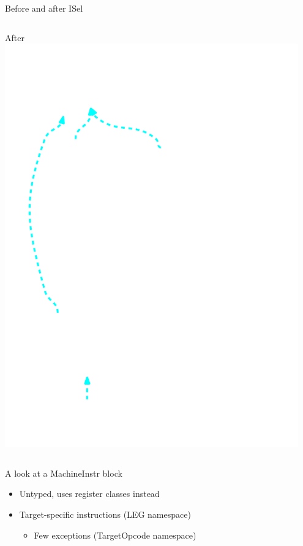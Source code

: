 \begin{frame}{Before and after ISel}
\begin{columns}[t]
\begin{block}{After}
        \includegraphics[width = 0.95\textwidth]{examples/ex1/ex1-entry-machine-dag.pdf}
    \end{block}
\end{columns}

\end{frame}


\begin{frame}{A look at a MachineInstr block}

\begin{itemize}
    \item Untyped, uses register classes instead
    \item Target-specific instructions (LEG namespace)
    \begin{itemize}
        \item Few exceptions (TargetOpcode namespace)
    \end{itemize}
\end{itemize}


\end{frame}
